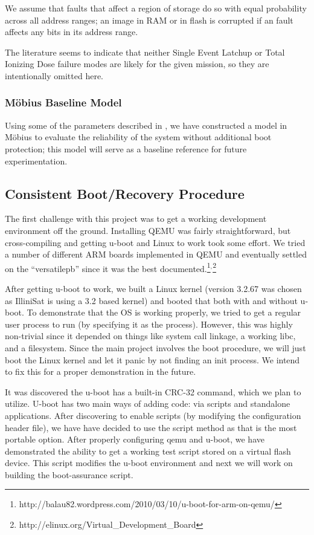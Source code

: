 We assume that faults that affect a region of storage do so with equal probability across all address ranges; an image in RAM or in flash is corrupted if an fault affects any bits in its address range.

The literature seems to indicate that neither Single Event Latchup \cite{Langley2004SEE} or Total Ionizing Dose \cite{Likar2010Novel, Oldham2008TID, Herrmann2013InSitu} failure modes are likely for the given mission, so they are intentionally omitted here.

\subsubsection{M\"obius Baseline Model}

Using some of the parameters described in \cite{Oldham2008TID}, we have constructed a model in M\"obius to evaluate the reliability of the system without additional boot protection; this model will serve as a baseline reference for future experimentation.

\subsection{Consistent Boot/Recovery Procedure}
The first challenge with this project was to get a working development
environment off the ground.  Installing QEMU was fairly straightforward, but
cross-compiling and getting u-boot and Linux to work took some effort.  We tried
a number of different ARM boards implemented in QEMU and eventually settled on
the ``versatilepb'' since it was the best documented.\footnote{http://balau82.wordpress.com/2010/03/10/u-boot-for-arm-on-qemu/}$^{,}$\footnote{http://elinux.org/Virtual\_Development\_Board}

After getting u-boot to work, we built a Linux kernel (version 3.2.67 was chosen
as IlliniSat is using a 3.2 based kernel) and booted that both with and without 
u-boot.  To demonstrate that the OS is working properly, we tried to get a
regular user process to run (by specifying it as the  process).
However, this was highly non-trivial since it depended on things like system
call linkage, a working libc, and a filesystem.  Since the main project involves
the boot procedure, we will just boot the Linux kernel and let it panic by not
finding an init process. We intend to fix this for a proper demonstration in the
future.

It was discovered the u-boot has a built-in CRC-32 command, which we plan to
utilize. U-boot has two main ways of adding code: via scripts and standalone
applications.  After discovering to enable scripts (by modifying the
configuration header file), we have have decided to use the script method as
that is the most portable option. After properly configuring qemu and u-boot, we
have demonstrated the ability to get a working test script stored on a virtual
flash device.  This script modifies the u-boot environment and next we will work
on building the boot-assurance script.  


